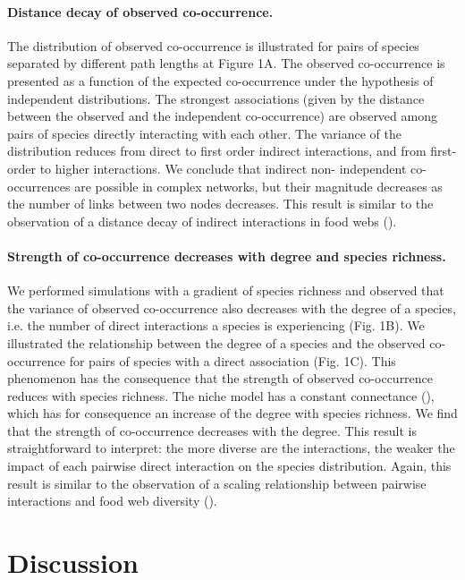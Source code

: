 \paragraph{Distance decay of observed co-occurrence.} The distribution of
observed co-occurrence is illustrated for pairs of species separated by
different path lengths at Figure 1A. The observed co-occurrence is presented
as a function of the expected co-occurrence under the hypothesis of
independent distributions. The strongest associations (given by the distance
between the observed and the independent co-occurrence) are observed among
pairs of species directly interacting with each other. The variance of the
distribution reduces from direct to first order indirect interactions, and
from first-order to higher interactions. We conclude that indirect non-
independent co-occurrences are possible in complex networks, but their
magnitude decreases as the number of links between two nodes decreases. This
result is similar to the observation of a distance decay of indirect
interactions in food webs (\citealt{Berlow2009Simple}).

\paragraph{Strength of co-occurrence decreases with degree and species
richness.} We performed simulations with a gradient of species richness and
observed that the variance of observed co-occurrence also decreases with the
degree of a species, i.e. the number of direct interactions a species is experiencing (Fig. 1B). We illustrated the relationship between the
degree of a species and the observed co-occurrence for pairs of species with a
direct association (Fig. 1C). This phenomenon has the consequence that the
strength of observed co-occurrence reduces with species richness. The niche
model has a constant connectance (\citealt{Williams2000Simple}), which has for consequence an increase of the degree with species richness. We find that the strength of co-occurrence
decreases with the degree. This result is straightforward to interpret: the
more diverse are the interactions, the weaker the impact of each
pairwise direct interaction on the species distribution. Again, this result is
similar to the observation of a scaling relationship between pairwise
interactions and food web diversity (\citealt{Berlow2009Simple}).

\section*{Discussion}
\label{discussion}

